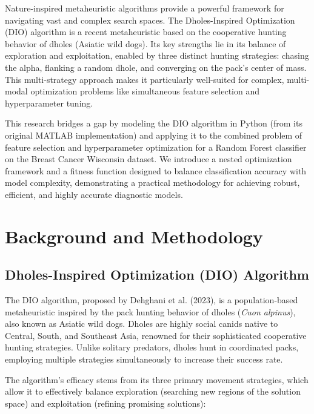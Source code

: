 \documentclass[12pt, a4paper]{article}
\begin{document}
Nature-inspired metaheuristic algorithms provide a powerful framework for navigating vast and complex search spaces. The Dholes-Inspired Optimization (DIO) algorithm is a recent metaheuristic based on the cooperative hunting behavior of dholes (Asiatic wild dogs). Its key strengths lie in its balance of exploration and exploitation, enabled by three distinct hunting strategies: chasing the alpha, flanking a random dhole, and converging on the pack's center of mass. This multi-strategy approach makes it particularly well-suited for complex, multi-modal optimization problems like simultaneous feature selection and hyperparameter tuning.

This research bridges a gap by modeling the DIO algorithm in Python (from its original MATLAB implementation) and applying it to the combined problem of feature selection and hyperparameter optimization for a Random Forest classifier on the Breast Cancer Wisconsin dataset. We introduce a nested optimization framework and a fitness function designed to balance classification accuracy with model complexity, demonstrating a practical methodology for achieving robust, efficient, and highly accurate diagnostic models.

\section{Background and Methodology}

\subsection{Dholes-Inspired Optimization (DIO) Algorithm}
The DIO algorithm, proposed by Dehghani et al. (2023), is a population-based metaheuristic inspired by the pack hunting behavior of dholes (\textit{Cuon alpinus}), also known as Asiatic wild dogs. Dholes are highly social canids native to Central, South, and Southeast Asia, renowned for their sophisticated cooperative hunting strategies. Unlike solitary predators, dholes hunt in coordinated packs, employing multiple strategies simultaneously to increase their success rate.

The algorithm's efficacy stems from its three primary movement strategies, which allow it to effectively balance exploration (searching new regions of the solution space) and exploitation (refining promising solutions):
\end{document}
